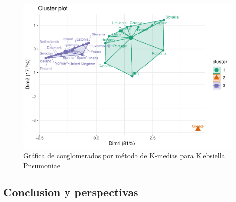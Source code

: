 \documentclass[
]{article}
\begin{document}
\begin{figure}
\centering
\includegraphics{4_actividad_cluster_files/figure-latex/conglomerados K medias para kpneumoniae-1.pdf}
\caption{Gráfica de conglomerados por método de K-medias para Klebsiella
Pneumoniae}
\end{figure}

\hypertarget{conclusion-y-perspectivas}{%
\subsection{Conclusion y perspectivas}\label{conclusion-y-perspectivas}}
\end{document}
